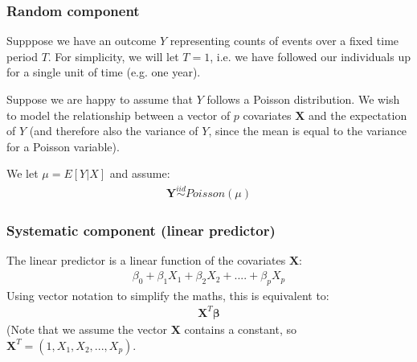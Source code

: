 \documentclass[letterpaper,10pt,english]{jupyterBook}
\begin{document}
\subsubsection{Random component}
\label{\detokenize{16.g. Generalised Linear Model (GLM):random-component}}
\sphinxAtStartPar
Supppose we have an outcome \(Y\) representing counts of events over a fixed time period \(T\). For simplicity, we will let \(T=1\), i.e. we have followed our individuals up for a single unit of time (e.g. one year).

\sphinxAtStartPar
Suppose we are happy to assume that \(Y\) follows a Poisson distribution. We wish to model the relationship between a vector of \(p\) covariates \(\mathbf{X}\) and the expectation of \(Y\) (and therefore also the variance of \(Y\), since the mean is equal to the variance for a Poisson variable).

\sphinxAtStartPar
We let \(\mu = E[Y | X]\) and assume:
\begin{equation*}
\begin{split} 
\mathbf{Y} \overset{iid}{\sim} Poisson(\mu)
\end{split}
\end{equation*}

\subsubsection{Systematic component (linear predictor)}
\label{\detokenize{16.g. Generalised Linear Model (GLM):systematic-component-linear-predictor}}
\sphinxAtStartPar
The linear predictor is a linear function of the covariates \(\mathbf{X}\):
\begin{equation*}
\begin{split}
\beta_0 + \beta_1 X_1 + \beta_2 X_2 + .... + \beta_p X_p 
\end{split}
\end{equation*}
\sphinxAtStartPar
Using vector notation to simplify the maths, this is equivalent to:
\begin{equation*}
\begin{split}
\mathbf{X}^T\mathbf{\beta}
\end{split}
\end{equation*}
\sphinxAtStartPar
(Note that we assume the vector \(\mathbf{X}\) contains a constant, so \(\mathbf{X}^T = (1, X_1, X_2, ..., X_p)\).
\end{document}
